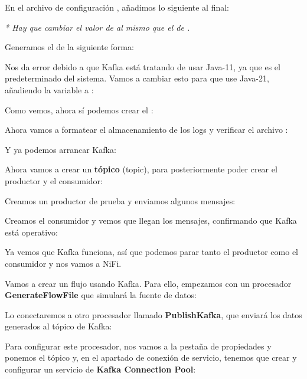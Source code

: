 \documentclass{../../../miPlantilla}
\begin{document}
En el archivo de configuración , añadimos lo siguiente al final:


\textit{* Hay que cambiar el valor de  al mismo que el de .}

Generamos el  de la siguiente forma:


Nos da error debido a que Kafka está tratando de usar Java-11, ya que es el predeterminado del sistema. Vamos a cambiar esto para que use Java-21, añadiendo la variable  a :


Como vemos, ahora sí podemos crear el :


Ahora vamos a formatear el almacenamiento de los logs y verificar el archivo :


Y ya podemos arrancar Kafka:


\newpage

Ahora vamos a crear un \textbf{tópico} (topic), para posteriormente poder crear el productor y el consumidor:


Creamos un productor de prueba y enviamos algunos mensajes:


Creamos el consumidor y vemos que llegan los mensajes, confirmando que Kafka está operativo:


Ya vemos que Kafka funciona, así que podemos parar tanto el productor como el consumidor y nos vamos a NiFi.

Vamos a crear un flujo usando Kafka. Para ello, empezamos con un procesador \textbf{GenerateFlowFile} que simulará la fuente de datos:


Lo conectaremos a otro procesador llamado \textbf{PublishKafka}, que enviará los datos generados al tópico de Kafka:


Para configurar este procesador, nos vamos a la pestaña de propiedades y ponemos el tópico y, en el apartado de conexión de servicio, tenemos que crear y configurar un servicio de \textbf{Kafka Connection Pool}:
\end{document}

